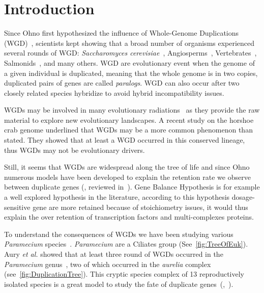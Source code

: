 \section*{Introduction}
\label{sec:Introduction}

Since Ohno first hypothesized the influence of Whole-Genome Duplications (WGD)~\citep{ohno_enormous_1970}, scientists kept showing that a broad number of organisms experienced several rounds of WGD: \textit{Saccharomyces cerevisiae}~\citep{kellis_proof_2004}, Angiosperms~\citep{arrigo_rarely_2012}, Vertebrates~\citep{dehal_two_2005}, Salmonids~\citep{alexandrou_genome_2013}, and many others. WGD are evolutionary event when the genome of a given individual is duplicated, meaning that the whole genome is in two copies, duplicated pairs of genes are called \textit{paralogs}. WGD can also occur after two closely related species hybridize to avoid hybrid incompatibility issues.

WGDs may be involved in many evolutionary radiations~\citep{alexandrou_genome_2013} as they provide the raw material to explore new evolutionary landscapes. A recent study on the horshoe crab genome underlined that WGDs may be a more common phenomenon than stated. They showed that at least a WGD occurred in this conserved lineage, thus WGDs may not be evolutionary drivers.

Still, it seems that WGDs are widespread along the tree of life and since Ohno numerous models have been developed to explain the retention rate we observe between duplicate genes (\citet{chain_odds_2011}, reviewed in~\citet{innan_evolution_2010}). Gene Balance Hypothesis is for example a well explored hypothesis in the literature, according to this hypothesis dosage-sensitive gene are more retained because of stoichiometry issues, it would thus explain the over retention of transcription factors and multi-complexes proteins.

To understand the consequences of WGDs we have been studying various \textit{Paramecium} species~\citep{beisson_paramecium_2010}. \textit{Paramecium} are a Ciliates group (See~\autoref{fig:TreeOfEuk}). Aury \textit{et al.} showed that at least three round of WGDs occurred in the \textit{Paramecium} genus~\citep{aury_global_2006}, two of which occurred in the \textit{aurelia} complex (see~\autoref{fig:DuplicationTree}). This cryptic species complex of 13 reproductively isolated species is a great model to study the fate of duplicate genes~(\citealt{catania_genetic_2009},~\citealt{mcgrath_insights_2014}).

